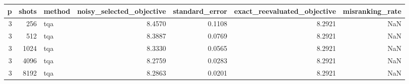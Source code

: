 \begin{tabular}{rrlrrrr}
\toprule
p & shots & method & noisy_selected_objective & standard_error & exact_reevaluated_objective & misranking_rate \\
\midrule
3 & 256 & tqa & 8.4570 & 0.1108 & 8.2921 & NaN \\
3 & 512 & tqa & 8.3887 & 0.0769 & 8.2921 & NaN \\
3 & 1024 & tqa & 8.3330 & 0.0565 & 8.2921 & NaN \\
3 & 4096 & tqa & 8.2759 & 0.0283 & 8.2921 & NaN \\
3 & 8192 & tqa & 8.2863 & 0.0201 & 8.2921 & NaN \\
\bottomrule
\end{tabular}

